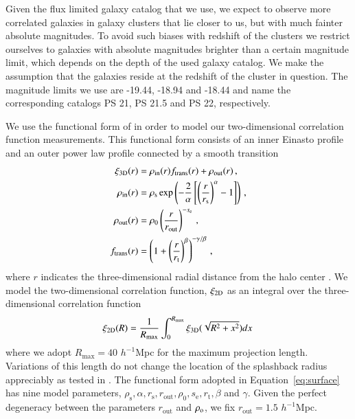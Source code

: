 \documentclass[iop, apjl, twocolappendix, numberedappendix]{emulateapj}
\begin{document}
Given the flux limited galaxy catalog that we use, we expect to
observe more correlated galaxies in galaxy clusters that lie closer
to us, but with much fainter absolute magnitudes. To avoid
such biases with redshift of the clusters we restrict ourselves to
galaxies with absolute magnitudes brighter than a certain magnitude
limit, which depends on the depth of the used galaxy catalog. We
make the assumption that the galaxies reside at the redshift of the
cluster in question. The magnitude limits we use are -19.44, -18.94 and -18.44
and name the corresponding catalogs PS 21, PS 21.5 and PS 22, respectively.

We use the functional form of \citet{diemer2014dependence} in order
to model our two-dimensional correlation function measurements. This
functional form consists of an inner Einasto profile and an outer
power law profile connected by a smooth transition
\begin{align}
\xi_{\rm 3D}(r) &= \rho_{\mathrm{in}}(r)f_{\mathrm{trans}}(r) + \rho_{\mathrm{out}}(r)\,, \label{eq:model} \\
\rho_{\mathrm{in}}(r)&=\rho_{\mathrm{s}}\exp\left( -\frac{2}{\alpha}\left[ \left( \frac{r}{r_{\mathrm{s}}}\right)^{\alpha}-1 \right] \right)\,,\\
\rho_{\mathrm{out}}(r)&=\rho_{\mathrm{0}}\left( \frac{r}{r_{\mathrm{out}}}\right)^{-s_{\mathrm{e}}} \,,\\
f_{\mathrm{trans}}(r)&=\left( 1+\left( \frac{r}{r_{\mathrm{t}}} \right)^{\beta} \right)^{-\gamma/ \beta}\,,
\label{eq:dk14}
\end{align}
where $r$ indicates the three-dimensional radial distance from the
halo center \citep{diemer2014dependence}. We model the
two-dimensional correlation function, $\xi_{\rm 2D}$ as an integral
over the three-dimensional correlation function
\begin{equation}
\xi_{\rm 2D}(R)=\frac{1}{R_{\rm max}}\int^{R_{\mathrm{max}}}_0 \xi_{\rm 3D}(\sqrt{R^2+x^2}) dx \,
\label{eq:surface}
\end{equation}
where we adopt $R_{\mathrm{max}}=40$ $h^{-1}$Mpc for the maximum projection
length. Variations of this length do not change the location of the
splashback radius appreciably as tested in
\citet{more2016detection}. The functional form adopted in
Equation~\ref{eq:surface} has nine model parameters,
$\rho_{\mathrm{s}}, \alpha, r_{\mathrm{s}}, r_{\mathrm{out}},
\rho_{\mathrm{0}}, s_{\mathrm{e}}, r_{\mathrm{t}}, \beta$ and
$\gamma$. Given the perfect degeneracy between the parameters
$r_{\mathrm{out}}$ and $\rho_{\rm o}$, we fix $r_{\mathrm{out}}=1.5$ $
h^{-1}$Mpc. 
\end{document}
